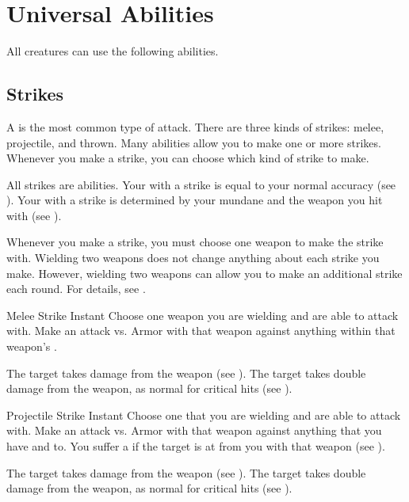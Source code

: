 \section{Universal Abilities}\label{Universal Abilities}
    All creatures can use the following abilities.

    \subsection{Strikes}\label{Strikes}
        A  is the most common type of attack.
        There are three kinds of strikes: melee, projectile, and thrown.
        Many abilities allow you to make one or more strikes.
        Whenever you make a strike, you can choose which kind of strike to make.

        All strikes are  abilities.
        Your  with a strike is equal to your normal accuracy (see ).
        Your  with a strike is determined by your mundane  and the weapon you hit with (see ).

        Whenever you make a strike, you must choose one weapon to make the strike with.
        Wielding two weapons does not change anything about each strike you make.
        However, wielding two weapons can allow you to make an additional strike each round.
        For details, see .

        \begin{instantability}{Melee Strike}
            \label{Melee Strike}
            Instant
            \rankline
            Choose one  weapon you are wielding and are able to attack with.
            Make an attack vs. Armor with that weapon against anything within that weapon's .

            \hit The target takes damage from the weapon (see ).
            \crit The target takes double damage from the weapon, as normal for critical hits (see ).
        \end{instantability}

        \begin{instantability}{Projectile Strike}
            \label{Projectile Strike}
            Instant
            \rankline
            Choose one  that you are wielding and are able to attack with.
            Make an attack vs. Armor with that weapon against anything that you have  and  to.
            You suffer a  if the target is at  from you with that weapon (see ).

            \hit The target takes damage from the weapon (see ).
            \crit The target takes double damage from the weapon, as normal for critical hits (see ).
        \end{instantability}

